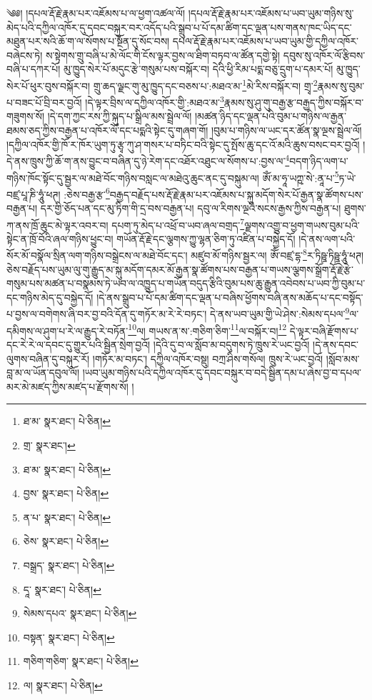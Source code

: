 \setcounter{footnote}{0} 
༄༅། །དཔལ་རྡོ་རྗེ་རྣམ་པར་འཇོམས་པ་ལ་ཕྱག་འཚལ་ལོ། །དཔལ་རྡོ་རྗེ་རྣམ་པར་འཇོམས་པ་ཡབ་ཡུམ་གཉིས་སུ་མེད་པའི་དཀྱིལ་འཁོར་དུ་དབང་བསྐུར་བར་འདོད་པའི་སྒྲུབ་པ་པོ་དམ་ཚིག་དང་ལྡན་པས་གནས་ཁང་ཡིད་དང་མཐུན་པར་སའི་ཆོ་ག་ལ་སོགས་པ་སྔོན་དུ་སོང་བས། དཔལ་རྡོ་རྗེ་རྣམ་པར་འཇོམས་པ་ཡབ་ཡུམ་གྱི་དཀྱིལ་འཁོར་བཞེངས་ཏེ། ས་སྟེགས་གྲུ་བཞི་པ་མེ་ལོང་གི་ངོས་ལྟར་བྱས་ལ་ཐིག་བཏབ་ལ་ཚོན་དགྱེ་སྟེ། དབུས་སུ་འཁོར་ལོ་རྩིབས་བཞི་པ་དཀར་པོ། མུ་ཁྱུད་སེར་པོ་མདུང་རྩེ་གསུམ་པས་བསྐོར་བ། དེའི་ཕྱི་རིམ་པདྨ་བཅུ་དྲུག་པ་དམར་པོ། མུ་ཁྱུད་སེར་པོ་ཕུར་བུས་བསྐོར་བ། གྲུ་ཆད་ལྗང་གུ་མུ་ཁྱུད་དང་བཅས་པ་:མཐའ་མ་\footnote{ཐ་མ་  སྣར་ཐང་།  པེ་ཅིན། }མེ་རིས་བསྐོར་བ། གྲྭ་\footnote{གྲ་  སྣར་ཐང་། }རྣམས་སུ་བུམ་པ་བཟང་པོ་བྲི་བར་བྱའོ། །དེ་ལྟར་བྲིས་ལ་དཀྱིལ་འཁོར་གྱི་:མཐའ་མ་\footnote{ཐ་མ་  སྣར་ཐང་།  པེ་ཅིན། }རྣམས་སུ་ཤུ་གུ་བརྒྱ་རྩ་བརྒྱད་ཀྱིས་བསྐོར་བ་གཟུགས་སོ། །དེ་དག་ཀྱང་རས་ཀྱི་སྐུད་པ་སྒྲིལ་མས་སྦྲེལ་ལོ། །མཚན་ཉིད་དང་ལྡན་པའི་བུམ་པ་གཉིས་ལ་རྒྱན་ཐམས་ཅད་ཀྱིས་བརྒྱན་པ་འཁོར་ལོ་དང་པདྨའི་སྟེང་དུ་གཞག་གོ། །བུམ་པ་གཉིས་ལ་ཡང་དར་ཚོན་སྣ་ལྔས་སྦྲེལ་ལོ། །དཀྱིལ་འཁོར་གྱི་ཁོ་ར་ཁོར་ཡུག་ཏུ་རྩྭ་ཀུ་ཤ་གསར་པ་བཏིང་བའི་སྟེང་དུ་སྤོས་ཆུ་དང་འོ་མའི་ཆུས་བསང་བར་བྱའོ། །དེ་ནས་ཁྲུས་ཀྱི་ཆོ་ག་ནས་བྱུང་བ་བཞིན་དུ་ཉེ་རེག་དང་འཐོར་འཐུང་ལ་སོགས་པ་:བྱས་ལ་\footnote{བྱས་  སྣར་ཐང་།  པེ་ཅིན། }བདག་ཉིད་ལག་པ་གཉིས་ཁོང་སྟོང་དུ་སྦྱར་ལ་མཐེ་བོང་གཉིས་བསླང་ལ་མཐེའུ་ཆུང་ནང་དུ་བསྐུམ་ལ། ཨོཾ་མ་ཧཱ་ཡཀྵ་སེ་:ནཱ་པ་\footnote{ན་པ་  སྣར་ཐང་།  པེ་ཅིན། }ཏ་ཡེ་བཛྲ་པཱ་ཎི་ཧཱུཾ་ཕཊ། :ཅེས་བརྒྱ་རྩ་\footnote{ཅེས་  སྣར་ཐང་།  པེ་ཅིན། }བརྒྱད་བརྗོད་པས་རྡོ་རྗེ་རྣམ་པར་འཇོམས་པ་སྐུ་མདོག་སེར་པོ་རྒྱན་སྣ་ཚོགས་པས་བརྒྱན་པ། དར་གྱི་ཅོད་པན་དང་མུ་ཏིག་གི་དྲ་བས་བརྒྱན་པ། དབུ་ལ་རིགས་ལྔའི་སངས་རྒྱས་ཀྱིས་བརྒྱན་པ། ཐུགས་ཀ་ནས་ཁྲོ་ཆུང་མེ་ལྟར་འབར་བ། དཔག་ཏུ་མེད་པ་འཕྲོ་བ་ཡབ་ཞལ་བགྲད་\footnote{བསྒྲད་  སྣར་ཐང་།  པེ་ཅིན། }ལྗགས་འགྱུ་བ་ཕྱག་གཡས་བུམ་པའི་སྟེང་ན་ཁྲོ་བོའི་ཞལ་གཉིས་ཕྱུང་བ། གཡོན་རྡོ་རྗེ་དང་ལྕགས་ཀྱུ་ལྷན་ཅིག་ཏུ་འཛིན་པ་བསྐྱེད་དོ། །དེ་ནས་ལག་པའི་སོར་མོ་བསྣོལ་སྲིན་ལག་གཉིས་བསྒྲེངས་ལ་མཐེ་བོང་དང་། མཛུབ་མོ་གཉིས་སྦྱར་ལ། ཨོཾ་བཛྲ་དྷ་\footnote{དཱ་  སྣར་ཐང་།  པེ་ཅིན། }ར་ཏིཥྛ་ཏིཥྛ་ཧཱུཾ་ཕཊ། ཅེས་བརྗོད་པས་ཡུམ་ལུ་གུ་རྒྱུད་མ་སྐུ་མདོག་དམར་མོ་རྒྱན་སྣ་ཚོགས་པས་བརྒྱན་པ་གཡས་ལྕགས་སྒྲོག་རྡོ་རྗེ་རྩེ་གསུམ་པས་མཚན་པ་བསྣམས་ཏེ་ཡབ་ལ་འཁྱུད་པ་གཡོན་བདུད་རྩིའི་བུམ་པས་ཆུ་རྒྱུན་འབེབས་པ་ཡབ་ཀྱི་བུམ་པ་དང་གཉིས་མེད་དུ་བསྐྱེད་དོ། །དེ་ནས་སྒྲུབ་པ་པོ་དམ་ཚིག་དང་ལྡན་པ་བཞིས་ཕྱོགས་བཞི་ནས་མཆོད་པ་དང་བསྟོད་པ་བྱས་ལ་བགེགས་ཞི་བར་བྱ་བའི་དོན་དུ་གཏོར་མ་རེ་རེ་བཏང་། དེ་ནས་ཡབ་ཡུམ་གྱི་ཡེ་ཤེས་:སེམས་དཔལ་\footnote{སེམས་དཔའ་  སྣར་ཐང་།  པེ་ཅིན། }ལ་དམིགས་ལ་ཤུག་པ་རེ་ལ་རྒྱུད་རེ་བཏོན་\footnote{བསྟན་  སྣར་ཐང་།  པེ་ཅིན། }ལ། གཡས་ན་ས་:གཅིག་ཅིག་\footnote{གཅིག་གཅིག་  སྣར་ཐང་།  པེ་ཅིན། }ལ་བསྐོར་བ།\footnote{ལ།  སྣར་ཐང་།  པེ་ཅིན། } དེ་ལྟར་བཞི་རྫོགས་པ་དང་རེ་རེ་ལ་དབང་དུ་གྱུར་པའི་སྦྱིན་སྲེག་བྱའོ། །དེའི་དུ་བ་ལ་སློབ་མ་བདུགས་ཏེ་ཁྲུས་རེ་ཡང་བྱའོ། །དེ་ནས་དབང་ལུགས་བཞིན་དུ་བསྐུར་རོ། །གཏོར་མ་བཏང་། དཀྱིལ་འཁོར་བསྡུ། བཀྲ་ཤིས་གསོལ། ཁྲུས་རེ་ཡང་བྱའོ། །སློབ་མས་བླ་མ་ལ་ཡོན་དབུལ་ལོ། །ཡབ་ཡུམ་གཉིས་པའི་དཀྱིལ་འཁོར་དུ་དབང་བསྐུར་བ་བདེ་སྦྱིན་དམ་པ་ཞེས་བྱ་བ་དཔལ་མར་མེ་མཛད་ཀྱིས་མཛད་པ་རྫོགས་སོ། ། 